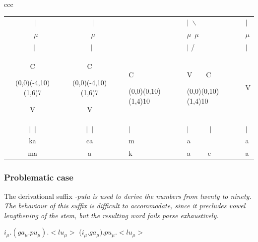 \begin{tabular}{ccc}
\begin{tabular}{ccllll}
~~$\mid$&~~$\mid$&          & & $\mid$~$\backslash$    & $\mid$\\
~~$\mu$&~~$\mu$&            & & $\mu$~$\mu$   & $\mu$\\
~$\mid$&~$\mid$&            & & $\mid$ /~~~~~ & $\mid$\\
C\begin{picture}(0,0)\put(-4,10){\line(1,6){7}}\end{picture}V & C\begin{picture}(0,0)\put(-4,10){\line(1,6){7}}\end{picture}V &                   &C\begin{picture}(0,0)\put(0,10){\line(1,4){10}}\end{picture}& V~~~~C\begin{picture}(0,0)\put(0,10){\line(1,4){10}}\end{picture}   & V\\
$\mid$~$\mid$&$\mid$~$\mid$ & & $\mid$ & $\mid$~~~~~~$\mid$ & $\mid$\\
ka & ca&                    &m& a~~~~~\dentt   & a\\
ma & \dentt a&                    &k& a~~~~~c   & a\\
\end{tabular}                            
\end{tabular}
\z

\subsubsection{Problematic case}\label{sec:phon:Problematiccase}
The derivational suffix \em -pulu \em is used to derive the numbers from twenty to ninety. The behaviour of this suffix is difficult to accommodate, since it precludes vowel lengthening of the stem, but the resulting word fails parse exhaustively.

\ea
	\ea \dentt$ i_\mu.(ga_\mu.pu_\mu).<lu_\mu>$
	\ex (\dentt$ i_\mu.ga_\mu).pu_\mu.<lu_\mu>$
\z\z



% 


